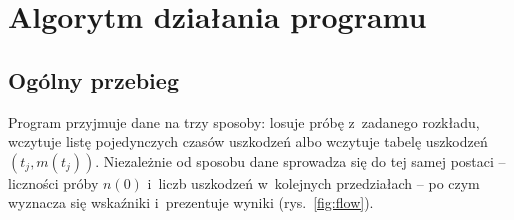\section{Algorytm działania programu}

\subsection{Ogólny przebieg}

Program przyjmuje dane na trzy sposoby: losuje próbę z~zadanego rozkładu, wczytuje
listę pojedynczych czasów uszkodzeń albo wczytuje tabelę uszkodzeń $(t_j, m(t_j))$.
Niezależnie od sposobu dane sprowadza się do tej samej postaci -- liczności próby
$n(0)$ i~liczb uszkodzeń w~kolejnych przedziałach -- po czym wyznacza się wskaźniki
i~prezentuje wyniki (rys.~\ref{fig:flow}).

